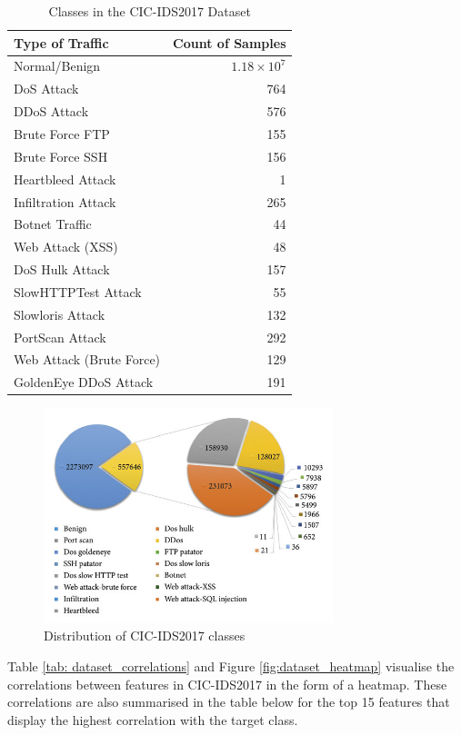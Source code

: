 \begin{table}[h] 
\centering 
\caption{Classes in the CIC-IDS2017 Dataset} 
\label{tab:dataset_classes} 
\begin{tabular}{lr} 
\toprule 
Type of Traffic & Count of Samples \\ 
\midrule 
Normal/Benign & $1.18\times10^7$ \\ 
DoS Attack & 764 \\ 
DDoS Attack & 576 \\ 
Brute Force FTP & 155 \\ 
Brute Force SSH & 156 \\ 
Heartbleed Attack & 1 \\ 
Infiltration Attack & 265 \\ 
Botnet Traffic & 44 \\ 
Web Attack (XSS) & 48 \\ 
DoS Hulk Attack & 157 \\ 
SlowHTTPTest Attack & 55 \\ 
Slowloris Attack & 132 \\ 
PortScan Attack & 292 \\ 
Web Attack (Brute Force) & 129 \\ 
GoldenEye DDoS Attack & 191 \\ 
\bottomrule 
\end{tabular} 
\end{table} 

\begin{figure}[H] 
\centering 
\includegraphics[width=0.75\textwidth]{assets/figures/dataset_distr.jpg} 
\caption{Distribution of CIC-IDS2017 classes} 
\label{fig:dataset_distr} 
\end{figure} 
\parencite{article5672}

Table \ref{tab: dataset_correlations} and Figure \ref{fig:dataset_heatmap} visualise the correlations between features in CIC-IDS2017 in the form of a heatmap. These correlations are also summarised in the table below for the top 15 features that display the highest correlation with the target class.

